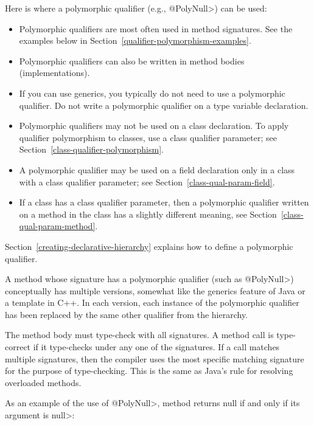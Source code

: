 Here is where a polymorphic qualifier (e.g., \<@PolyNull>) can be used:
\begin{itemize}
\item Polymorphic qualifiers are most often used in method signatures.
  See the examples below in Section~\ref{qualifier-polymorphism-examples}.
\item Polymorphic qualifiers can also be written in method bodies
  (implementations).
\item If you can use generics, you typically do not need to use a
  polymorphic qualifier.  Do not write a polymorphic qualifier on a type
  variable declaration.
\item Polymorphic qualifiers may not be used on a class declaration.
  To apply qualifier polymorphism to classes, use a class qualifier
  parameter; see Section~\ref{class-qualifier-polymorphism}.
\item A polymorphic qualifier may be used on a field declaration only in a
  class with a class qualifier parameter; see Section~\ref{class-qual-param-field}.
\item If a class has a class qualifier parameter, then a polymorphic
  qualifier written on a method in the class has a slightly different
  meaning, see Section~\ref{class-qual-param-method}.
\end{itemize}

Section~\ref{creating-declarative-hierarchy} explains how to define a
polymorphic qualifier.



A method whose signature has a polymorphic qualifier (such as \<@PolyNull>) conceptually has multiple
versions, somewhat like the generics feature of Java or a template in C++.
In each version, each instance of the polymorphic qualifier has been
replaced by the same other qualifier from the hierarchy.

The method body must type-check with all signatures.  A method call is
type-correct if it type-checks under any one of the signatures.  If a call
matches multiple signatures, then the compiler uses the most specific
matching signature for the purpose of type-checking.  This is the same as
Java's rule for resolving overloaded methods.


As an example of the use of \<@PolyNull>, method
returns null if and only if its argument is \<null>:

